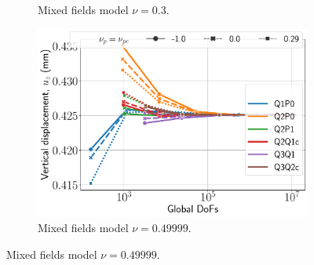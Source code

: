 \documentclass{beamer}
\begin{document}
\begin{frame}
\begin{figure}[H]
\begin{subfigure}{.5\textwidth}
			\caption{Mixed fields model $\nu = 0.3$.}
		\end{subfigure}%
		\begin{subfigure}{.5\textwidth}
			\centering
			\includegraphics[width=.8\textwidth]{../figs/u-punch2-mixed-0.49999.pdf}
			\caption{Mixed fields model $\nu = 0.49999$.}
		\end{subfigure}
	\end{figure}
\end{frame}
\end{document}
